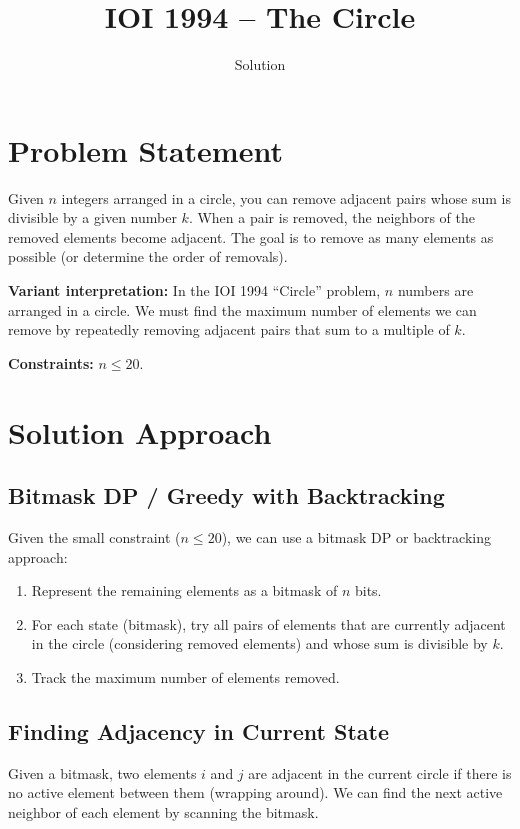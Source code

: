 \documentclass[11pt,a4paper]{article}
\title{IOI 1994 -- The Circle}
\author{Solution}
\date{}
\begin{document}
\maketitle

\section{Problem Statement}

Given $n$ integers arranged in a circle, you can remove adjacent pairs whose sum
is divisible by a given number $k$. When a pair is removed, the neighbors of the
removed elements become adjacent. The goal is to remove as many elements as possible
(or determine the order of removals).

\medskip
\noindent\textbf{Variant interpretation:} In the IOI 1994 ``Circle'' problem, $n$ numbers
are arranged in a circle. We must find the maximum number of elements we can remove by
repeatedly removing adjacent pairs that sum to a multiple of $k$.

\medskip
\noindent\textbf{Constraints:} $n \le 20$.

\section{Solution Approach}

\subsection{Bitmask DP / Greedy with Backtracking}

Given the small constraint ($n \le 20$), we can use a bitmask DP or backtracking approach:

\begin{enumerate}
  \item Represent the remaining elements as a bitmask of $n$ bits.
  \item For each state (bitmask), try all pairs of elements that are currently adjacent
        in the circle (considering removed elements) and whose sum is divisible by $k$.
  \item Track the maximum number of elements removed.
\end{enumerate}

\subsection{Finding Adjacency in Current State}
Given a bitmask, two elements $i$ and $j$ are adjacent in the current circle if there is
no active element between them (wrapping around). We can find the next active neighbor
of each element by scanning the bitmask.
\end{document}
